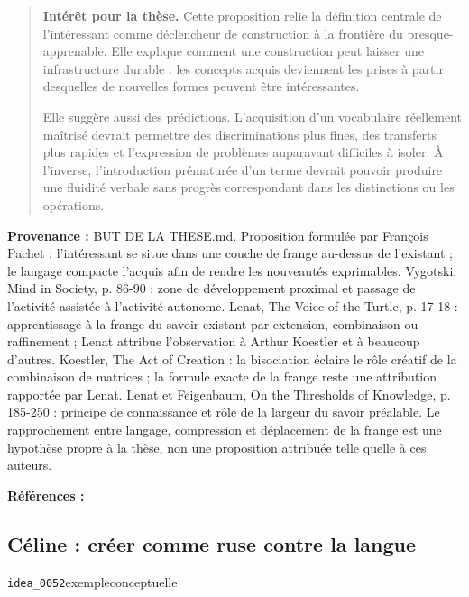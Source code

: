 \documentclass[10pt,a4paper]{article}
\begin{document}
\begin{quote}
\textbf{Intérêt pour la thèse.} Cette proposition relie la définition centrale de l'intéressant comme déclencheur de construction à la frontière du presque-apprenable. Elle explique comment une construction peut laisser une infrastructure durable : les concepts acquis deviennent les prises à partir desquelles de nouvelles formes peuvent être intéressantes.

Elle suggère aussi des prédictions. L'acquisition d'un vocabulaire réellement maîtrisé devrait permettre des discriminations plus fines, des transferts plus rapides et l'expression de problèmes auparavant difficiles à isoler. À l'inverse, l'introduction prématurée d'un terme devrait pouvoir produire une fluidité verbale sans progrès correspondant dans les distinctions ou les opérations.
\end{quote}
{\footnotesize\color{metadata}\textbf{Provenance :} BUT DE LA THESE.md. Proposition formulée par François Pachet : l'intéressant se situe dans une couche de frange au-dessus de l'existant ; le langage compacte l'acquis afin de rendre les nouveautés exprimables. Vygotski, Mind in Society, p. 86-90 : zone de développement proximal et passage de l'activité assistée à l'activité autonome. Lenat, The Voice of the Turtle, p. 17-18 : apprentissage à la frange du savoir existant par extension, combinaison ou raffinement ; Lenat attribue l'observation à Arthur Koestler et à beaucoup d'autres. Koestler, The Act of Creation : la bisociation éclaire le rôle créatif de la combinaison de matrices ; la formule exacte de la frange reste une attribution rapportée par Lenat. Lenat et Feigenbaum, On the Thresholds of Knowledge, p. 185-250 : principe de connaissance et rôle de la largeur du savoir préalable. Le rapprochement entre langage, compression et déplacement de la frange est une hypothèse propre à la thèse, non une proposition attribuée telle quelle à ces auteurs.\par}
{\footnotesize\color{metadata}\textbf{Références :} \parencite{vygotsky1978mind,lenat2008turtle,lenat1991thresholds,koestler1989act,schmidhuber2009compression}\par}

\subsection{Céline : créer comme ruse contre la langue}
{\small\color{metadata} \texttt{idea\_0052}\quad\textbullet\quad exemple\quad\textbullet\quad conceptuelle\par}
\end{document}
